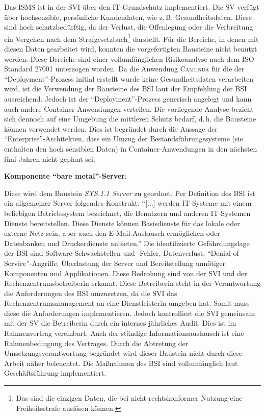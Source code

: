 Das \ac{ISMS} ist in der \ac{SVI} über den IT-Grundschutz implementiert. Die \ac{SV} verfügt über hochsensible, persönliche Kundendaten, wie z.\,B. Gesundheitsdaten. Diese sind hoch schutzbedürftig, da der Verlust, die Offenlegung oder die Verbreitung ein Vergehen nach dem Strafgesetzbuch\footnote{Das sind die einzigen Daten, die bei nicht-rechtskonformer Nutzung eine Freiheitsstrafe auslösen können.} darstellt. Für die Bereiche, in denen mit diesen Daten gearbeitet wird, konnten die vorgefertigten Bausteine nicht benutzt werden. Diese Bereiche sind einer vollumfänglichen Risikoanalyse nach dem ISO-Standard 27001 unterzogen worden. Da die Anwendung \textsc{Camunda} für die der \enquote{Deployment}-Prozess initial erstellt wurde keine Gesundheitsdaten verarbeiten wird, ist die Verwendung der Bausteine des \ac{BSI} laut der Empfehlung der \ac{BSI} ausreichend. Jedoch ist der \enquote{Deployment}-Prozess generisch angelegt und kann auch andere Container-Anwendungen verteilen. Die vorliegende Analyse bezieht sich dennoch auf eine Umgebung die mittleren Schutz bedarf, d.\,h. die Bausteine können verwendet werden. Dies ist begründet durch die Aussage der \enquote{Enterprise}-Architekten, dass ein Umzug der Bestandsführungssysteme (sie enthalten den hoch sensiblen Daten) in Container-Anwendungen in den nächsten fünf Jahren nicht geplant sei. 
\par
\textbf{Komponente \enquote{bare metal}-Server}:\label{sec:bareMetalServer}
\par
Diese wird dem Baustein \textit{SYS.1.1 Server} zu geordnet. Per Definition des \ac{BSI} ist ein allgemeiner Server folgendes Konstrukt: \enquote{[...] werden IT-Systeme mit einem beliebigen Betriebssystem bezeichnet, die Benutzern und anderen IT-Systemen Dienste bereitstellen. Diese Dienste können Basisdienste für das lokale oder externe Netz sein, aber auch den E-Mail-Austausch ermöglichen oder Datenbanken und Druckerdienste anbieten.}\autocite[][S.\,461]{bundesamt_fur_sicherheit_in_der_informationstechnik_bsi_it-grundschutz-kompendium_2020} Die identifizierte Gefährdungslage der \ac{BSI} sind Software-Schwachstellen und -Fehler, Datenverlust, \enquote{Denial of Service}-Angriffe, Überlastung der Server und Bereitstellung unnötiger Komponenten und Applikationen.\autocite[vgl.][S.\,461-462]{bundesamt_fur_sicherheit_in_der_informationstechnik_bsi_it-grundschutz-kompendium_2020} Diese Bedrohung sind von der \ac{SVI} und der Rechenzentrumsbetreiberin erkannt. Diese Betreiberin steht in der Verantwortung die Anforderungen des \ac{BSI} umzusetzen, da die \ac{SVI} das Rechenzentrumsmanagement an eine Dienstleisterin umgeben hat. Somit muss diese die Anforderungen implementieren. Jedoch kontrolliert die \ac{SVI} gemeinsam mit der \ac{SV} die Betreiberin durch ein internes jährliches Audit. Dies ist im Rahmenvertrag vereinbart. Auch der ständige Informationsaustausch ist eine Rahmenbedingung des Vertrages. Durch die Abtretung der Umsetzungsverantwortung begründet wird dieser Baustein nicht durch diese Arbeit näher beleuchtet. Die Maßnahmen des \ac{BSI} sind vollumfänglich laut Geschäftsführung implementiert.
